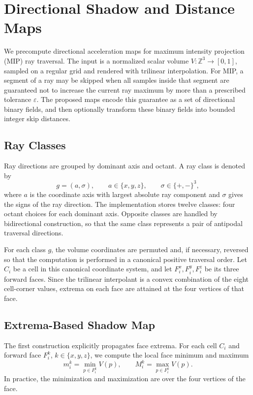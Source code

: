 \section{Directional Shadow and Distance Maps}
\label{sec:directional-shadow-distance-maps}

We precompute directional acceleration maps for maximum intensity projection
(MIP) ray traversal.  The input is a normalized scalar volume
\(V:\mathbb{Z}^{3}\rightarrow[0,1]\), sampled on a regular grid and rendered
with trilinear interpolation.  For MIP, a segment of a ray may be skipped when
all samples inside that segment are guaranteed not to increase the current ray
maximum by more than a prescribed tolerance \(\varepsilon\).  The proposed
maps encode this guarantee as a set of directional binary fields, and then
optionally transform these binary fields into bounded integer skip distances.

\subsection{Ray Classes}

Ray directions are grouped by dominant axis and octant.  A ray class is denoted
by
\[
    g = (a,\sigma),
    \qquad
    a\in\{x,y,z\},
    \qquad
    \sigma\in\{+,-\}^{3},
\]
where \(a\) is the coordinate axis with largest absolute ray component and
\(\sigma\) gives the signs of the ray direction.  The implementation stores
twelve classes: four octant choices for each dominant axis.  Opposite classes
are handled by bidirectional construction, so that the same class represents a
pair of antipodal traversal directions.

For each class \(g\), the volume coordinates are permuted and, if necessary,
reversed so that the computation is performed in a canonical positive
traversal order.  Let \(C_i\) be a cell in this canonical coordinate system,
and let \(F_i^x,F_i^y,F_i^z\) be its three forward faces.  Since the trilinear
interpolant is a convex combination of the eight cell-corner values, extrema
on each face are attained at the four vertices of that face.

\subsection{Extrema-Based Shadow Map}
\label{subsec:extrema-shadow-map}

The first construction explicitly propagates face extrema.  For each cell
\(C_i\) and forward face \(F_i^k\), \(k\in\{x,y,z\}\), we compute the local
face minimum and maximum
\[
    m_i^k = \min_{p\in F_i^k} V(p),
    \qquad
    M_i^k = \max_{p\in F_i^k} V(p).
\]
In practice, the minimization and maximization are over the four vertices of
the face.

